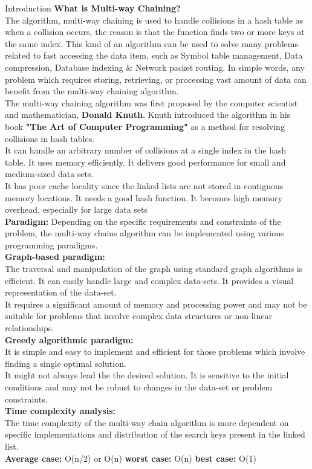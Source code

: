 \documentclass[final]{beamer}
\newlength{\colwidth}
\begin{document}
\begin{frame}[t]
\begin{columns}[t]
\begin{column}{\colwidth}
			\begin{block}{Introduction}
			\justifying
            \textbf{What is Multi-way Chaining?}\\
The algorithm, multi-way chaining is used to handle collisions in a hash table as when a collision occurs, the reason is that the function finds two or more keys at the same index.  This kind of an algorithm can be used to solve many problems related to  fast accessing the data item, such as Symbol table management, Data compression, Database indexing & Network packet routing. In simple words, any problem which requires storing, retrieving, or processing vast amount of data can benefit from the multi-way chaining algorithm.\\
The multi-way chaining algorithm was first proposed by the computer scientist and mathematician, \textbf{Donald Knuth}.  Knuth introduced the algorithm in his book \textbf{"The Art of Computer Programming"} as a method for resolving collisions in hash tables.\\
It can handle an arbitrary number of collisions at a single index in the hash table. It uses memory efficiently. It delivers good performance for small and medium-sized data sets.\\
It has poor cache locality since the linked lists are not stored in contiguous memory locations. It needs a good hash function. It becomes high memory overhead, especially for large data sets\\
\textbf{Paradigm:} Depending on the specific requirements and constraints of the problem, the multi-way chains algorithm can be implemented using various programming paradigms. \\ 
\textbf{Graph-based paradigm:}\\
The traversal and manipulation of the graph using standard graph algorithms is efficient. It can easily handle large and complex data-sets. It provides a visual representation of the data-set.\\
It requires a significant amount of memory and processing power and may not be suitable for problems that involve complex data structures or non-linear relationships.\\
\textbf{Greedy algorithmic paradigm:}\\
It is simple and easy to implement and efficient for those problems which involve finding a single optimal solution.\\
It might not always lead the the desired solution. It is sensitive to the initial conditions and may not be robust to changes in the data-set or problem constraints.
\\
\textbf{Time complexity analysis:}\\ 
The time complexity of the multi-way chain algorithm is more dependent on specific implementations and distribution of the search keys present in the linked list.\\
\textbf{Average case:}  O(n/2) or  O(n)
\textbf{worst case:} O(n)
\textbf{best case:} O(1)
                    


\end{block}
\end{column}
\end{columns}
\end{frame}
\end{document}
